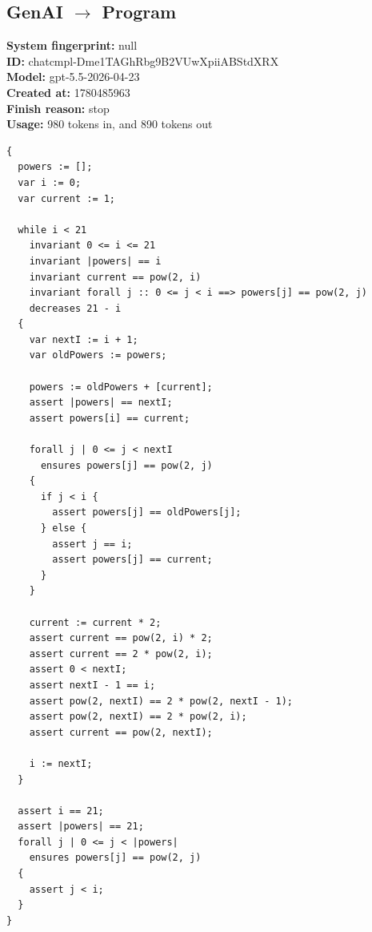 \documentclass{article}
\begin{document}
\subsection*{GenAI $\rightarrow$ Program}
\textbf{System fingerprint: }null
\\\textbf{ID: }chatcmpl-Dme1TAGhRbg9B2VUwXpiiABStdXRX
\\\textbf{Model: }gpt-5.5-2026-04-23
\\\textbf{Created at: }1780485963
\\\textbf{Finish reason: }stop
\\\textbf{Usage: }980 tokens in, and 890 tokens out
\begin{lstlisting}
{
  powers := [];
  var i := 0;
  var current := 1;

  while i < 21
    invariant 0 <= i <= 21
    invariant |powers| == i
    invariant current == pow(2, i)
    invariant forall j :: 0 <= j < i ==> powers[j] == pow(2, j)
    decreases 21 - i
  {
    var nextI := i + 1;
    var oldPowers := powers;

    powers := oldPowers + [current];
    assert |powers| == nextI;
    assert powers[i] == current;

    forall j | 0 <= j < nextI
      ensures powers[j] == pow(2, j)
    {
      if j < i {
        assert powers[j] == oldPowers[j];
      } else {
        assert j == i;
        assert powers[j] == current;
      }
    }

    current := current * 2;
    assert current == pow(2, i) * 2;
    assert current == 2 * pow(2, i);
    assert 0 < nextI;
    assert nextI - 1 == i;
    assert pow(2, nextI) == 2 * pow(2, nextI - 1);
    assert pow(2, nextI) == 2 * pow(2, i);
    assert current == pow(2, nextI);

    i := nextI;
  }

  assert i == 21;
  assert |powers| == 21;
  forall j | 0 <= j < |powers|
    ensures powers[j] == pow(2, j)
  {
    assert j < i;
  }
}
\end{lstlisting}
\end{document}
